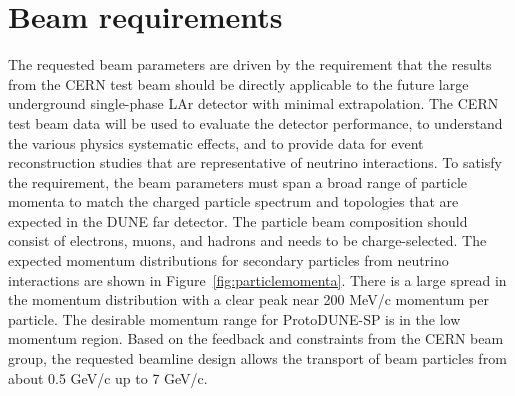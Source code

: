 \section{Beam requirements}
\label{sec:beamrequirements}

The requested beam parameters are driven by the requirement that the results from the CERN test beam should be directly applicable to the future large underground single-phase LAr detector with minimal extrapolation. The CERN test beam data will be used to evaluate the detector performance, to understand the various physics systematic effects, and to provide data for event reconstruction studies that are representative of neutrino interactions. To satisfy the requirement, the beam parameters must span a broad range of particle momenta to match the charged particle spectrum and topologies that are expected in the DUNE far detector. The particle beam composition should consist of electrons, muons, and hadrons and needs to be charge-selected. The expected momentum distributions for secondary particles from neutrino interactions are shown in Figure~\ref{fig:particlemomenta}. There is a large spread in the momentum distribution with a clear peak near 200 MeV/c momentum per particle. 
The desirable momentum range for ProtoDUNE-SP  is in the low momentum region. Based on the feedback and constraints from the CERN beam group, the requested beamline design allows the transport of beam particles from about 0.5 GeV/c up to 7 GeV/c. 

